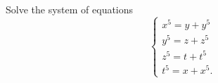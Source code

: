 Solve the system of equations\[\begin{cases}x^5=y+y^5\\ y^5=z+z^5\\ z^5=t+t^5\\ t^5=x+x^5.\end{cases}\]
